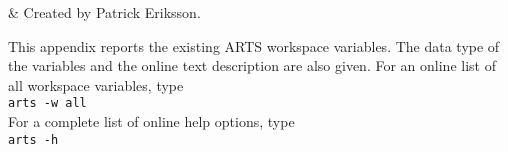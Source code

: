  \label{app:wsv}


 & Created by Patrick Eriksson. \\
\stophistory

 This appendix reports the existing ARTS workspace variables. The
 data type of the variables and the online text description are also
 given. For an online list of all workspace variables, type\\

 \verb|arts -w all| \\

 \noindent
 For a complete list of online help options, type\\ 

 \verb|arts -h| \\
 
 {\footnotesize
  }



